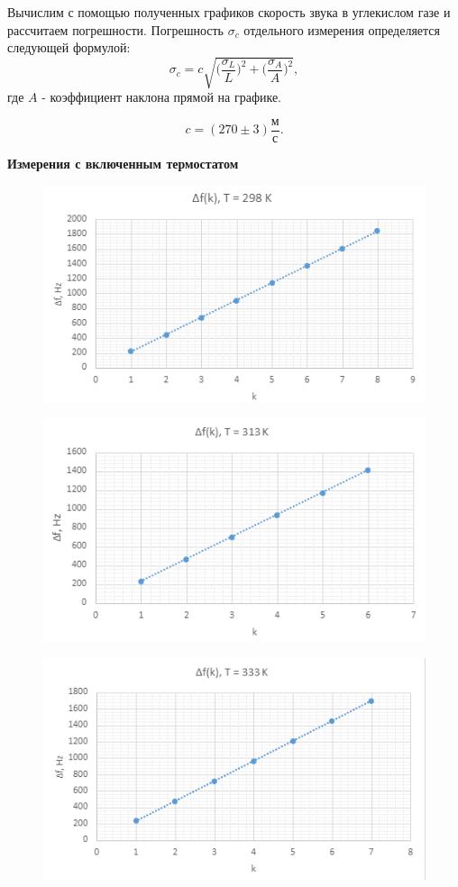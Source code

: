 \documentclass[12pt,a4paper]{article}
\begin{document}
Вычислим с помощью полученных графиков скорость звука в углекислом газе и рассчитаем погрешности. Погрешность $\sigma_{c}$ отдельного измерения определяется следующей формулой:
$$ \sigma_{c} =c \sqrt{\Big(\frac{\sigma_{L}}{L}\Big)^2+ \Big(\frac{\sigma_{A}}{A}\Big)^2},$$
где $A$ - коэффициент наклона прямой на графике.

$$c = (270\pm3)\frac{\text{м}}{\text{с}}.$$

\textbf{Измерения с включенным термостатом}
\begin{figure}[h]
    \centering
    \begin{center}
    \end{center}
    \includegraphics[width=10 cm]{tplot1.PNG}
    \label{fig:tplot1}
\end{figure}
\begin{figure}[h]
    \centering
    \begin{center}
    \end{center}
    \includegraphics[width=10 cm]{tplot2.PNG}
    \label{fig:tplot2}
\end{figure}
\begin{figure}[h]
    \centering
    \begin{center}
    \end{center}
    \includegraphics[width=10 cm]{tplot3.PNG}
    \label{fig:tplot3}
\end{figure}
\end{document}
